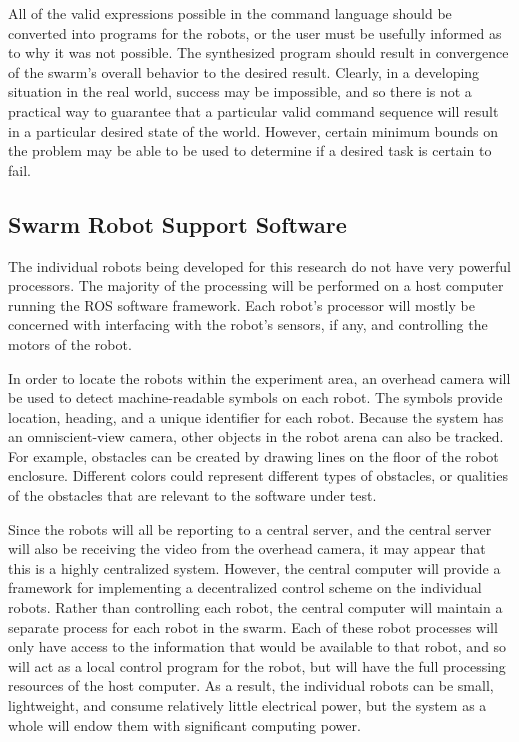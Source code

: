 \documentclass[]{article}
\begin{document}
All of the valid expressions possible in the command language should be converted into programs for the robots, or the user must be usefully informed as to why it was not possible. 
The synthesized program should result in convergence of the swarm's overall behavior to the desired result. 
Clearly, in a developing situation in the real world, success may be impossible, and so there is not a practical way to guarantee that a particular valid command sequence will result in a particular desired state of the world. 
However, certain minimum bounds on the problem may be able to be used to determine if a desired task is certain to fail. %

\subsection{Swarm Robot Support Software}

The individual robots being developed for this research do not have very powerful processors. 
The majority of the processing will be performed on a host computer running the ROS software framework. 
Each robot's processor will mostly be concerned with interfacing with the robot's sensors, if any, and controlling the motors of the robot. 

In order to locate the robots within the experiment area, an overhead camera will be used to detect machine-readable symbols on each robot. 
The symbols provide location, heading, and a unique identifier for each robot. 
Because the system has an omniscient-view camera, other objects in the robot arena can also be tracked. 
For example, obstacles can be created by drawing lines on the floor of the robot enclosure. 
Different colors could represent different types of obstacles, or qualities of the obstacles that are relevant to the software under test.

Since the robots will all be reporting to a central server, and the central server will also be receiving the video from the overhead camera, it may appear that this is a highly centralized system. 
However, the central computer will provide a framework for implementing a decentralized control scheme on the individual robots. 
Rather than controlling each robot, the central computer will maintain a separate process for each robot in the swarm. 
Each of these robot processes will only have access to the information that would be available to that robot, and so will act as a local control program for the robot, but will have the full processing resources of the host computer. 
As a result, the individual robots can be small, lightweight, and consume relatively little electrical power, but the system as a whole will endow them with significant computing power. 
\end{document}
